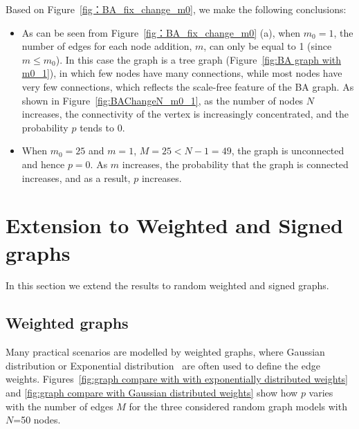 \documentclass[journal]{IEEEtran}
\begin{document}
 Based on Figure~\ref{fig：BA_fix_change_m0}, we make the following conclusions:
 \begin{itemize}
     \item  As can be seen from Figure~\ref{fig：BA_fix_change_m0} (a), when $m_0=1$, the number of edges for each node addition, $m$, can only be equal to 1 (since $m\leq m_0$). In this case the graph is a tree graph (Figure~\ref{fig:BA graph with m0_1}),  in which few nodes have many connections, while most nodes have very few connections, which reflects the scale-free feature of the BA graph. As shown in Figure~\ref{fig:BAChangeN_m0_1}, as the number of nodes $N$ increases, the connectivity of the vertex is increasingly concentrated, and the probability $p$ tends to 0.



 
 \item When $m_0=25$ and $m=1$, $M=25<N-1=49$, the graph is unconnected and hence $p=0$. As $m$ increases, the probability that the graph is connected increases, and as a result, $p$ increases.
\end{itemize}



\section{Extension to Weighted and Signed graphs}
\label{sec:weights}
In this section we extend the results to random weighted and signed graphs. 

\subsection{Weighted graphs}
Many practical scenarios are modelled by weighted graphs, where Gaussian distribution or Exponential distribution~\cite{spiegel2001probability} are often used to define the edge weights. Figures~\ref{fig:graph compare with with exponentially distributed weights} and \ref{fig:graph compare with Gaussian distributed weights} show how $p$ varies with the number of edges $M$ for the three considered random graph models with $N$=50 nodes.

\end{document}

